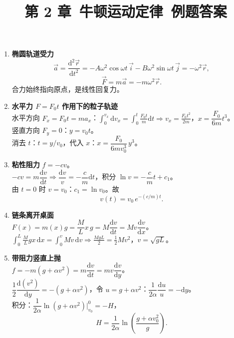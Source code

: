 \documentclass[12pt]{article}
\title{第 2 章\ 牛顿运动定律\ 例题答案}
\author{}
\date{}
\begin{document}
\maketitle

\begin{enumerate}[label=\textbf{例\arabic*.}, leftmargin=*]

\item \textbf{椭圆轨道受力}
\[
  \vec{a} = \frac{\mathrm{d}^2\vec{r}}{\mathrm{d}t^2} = -A\omega^2\cos\omega t\,\vec{i} - B\omega^2\sin\omega t\,\vec{j} = -\omega^2\vec{r},
\]
\[
  \vec{F} = m\vec{a} = -m\omega^2\vec{r}.
\]
合力始终指向原点，是线性回复力。

\item \textbf{水平力 $F=F_0 t$ 作用下的粒子轨迹}\\
水平方向 $F_x = F_0 t = m a_x$：$\displaystyle\int_0^{v_x} \mathrm{d}v_x = \int_0^t \frac{F_0 t}{m}\mathrm{d}t \Rightarrow v_x = \frac{F_0 t^2}{2m}$，$x = \dfrac{F_0}{6m}t^3$。\\
竖直方向 $F_y = 0$：$y = v_0 t$。\\
消去 $t$：$t = y/v_0$，代入 $x$：$x = \dfrac{F_0}{6m v_0^3}\,y^3$。

\item \textbf{粘性阻力} $f=-cv$。\\
$-cv = m\dfrac{\mathrm{d}v}{\mathrm{d}t} \Rightarrow \dfrac{\mathrm{d}v}{v} = -\dfrac{c}{m}\mathrm{d}t$，积分 $\ln v = -\dfrac{c}{m}t + c_1$。\\
由 $t=0$ 时 $v=v_0$：$c_1 = \ln v_0$。故
\[
  v(t) = v_0\,e^{-(c/m)t}.
\]

\item \textbf{链条离开桌面}\\
$F(x) = m(x)g = \dfrac{M}{L}x\,g = M\dfrac{\mathrm{d}v}{\mathrm{d}t} = Mv\dfrac{\mathrm{d}v}{\mathrm{d}x}$。\\
$\displaystyle\int_0^L \frac{M}{L}g x\,\mathrm{d}x = \int_0^v Mv\,\mathrm{d}v \Rightarrow \frac{MgL}{2} = \frac{1}{2}Mv^2$，$v = \sqrt{gL}$。

\item \textbf{带阻力竖直上抛}\\
$f = -m(g + \alpha v^2) = m\dfrac{\mathrm{d}v}{\mathrm{d}t} = m v\dfrac{\mathrm{d}v}{\mathrm{d}y}$。\\
$\dfrac{1}{2}\dfrac{\mathrm{d}(v^2)}{\mathrm{d}y} = -(g + \alpha v^2)$，令 $u = g + \alpha v^2$：$\dfrac{1}{2\alpha}\dfrac{\mathrm{d}u}{u} = -\mathrm{d}y$。\\
积分：$\dfrac{1}{2\alpha}\ln(g + \alpha v^2)\Big|_{v_0}^{0} = -H$，
\[
  H = \frac{1}{2\alpha}\ln\!\left(\frac{g + \alpha v_0^2}{g}\right).
\]


\end{enumerate}
\end{document}
